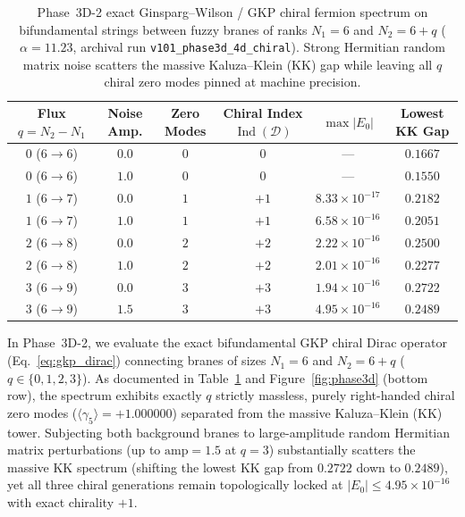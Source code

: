 \documentclass[11pt,a4paper]{article}
\begin{document}
\begin{table}[H]
  \centering
  \caption{Phase~3D-2 exact Ginsparg--Wilson / GKP chiral fermion spectrum on bifundamental strings between fuzzy branes of ranks $N_1 = 6$ and $N_2 = 6 + q$ ($\alpha = 11.23$, archival run \texttt{v101\_phase3d\_4d\_chiral}). Strong Hermitian random matrix noise scatters the massive Kaluza--Klein (KK) gap while leaving all $q$ chiral zero modes pinned at machine precision.}
  \label{tab:phase3d_chiral}
  \small
  \setlength{\tabcolsep}{6pt}
  \begin{tabular}{@{}cccccc@{}}
    \toprule
    Flux $q = N_2 - N_1$ & Noise Amp. & Zero Modes & Chiral Index $\operatorname{Ind}(\mathcal{D})$ & $\max |E_0|$ & Lowest KK Gap \\
    \midrule
    $0$ ($6 \to 6$) & $0.0$ & $0$ & $0$  & --- & $0.1667$ \\
    $0$ ($6 \to 6$) & $1.0$ & $0$ & $0$  & --- & $0.1550$ \\
    $1$ ($6 \to 7$) & $0.0$ & $1$ & $+1$ & $8.33\times 10^{-17}$ & $0.2182$ \\
    $1$ ($6 \to 7$) & $1.0$ & $1$ & $+1$ & $6.58\times 10^{-16}$ & $0.2051$ \\
    $2$ ($6 \to 8$) & $0.0$ & $2$ & $+2$ & $2.22\times 10^{-16}$ & $0.2500$ \\
    $2$ ($6 \to 8$) & $1.0$ & $2$ & $+2$ & $2.01\times 10^{-16}$ & $0.2277$ \\
    $3$ ($6 \to 9$) & $0.0$ & $3$ & $+3$ & $1.94\times 10^{-16}$ & $0.2722$ \\
    $3$ ($6 \to 9$) & $1.5$ & $3$ & $+3$ & $4.95\times 10^{-16}$ & $0.2489$ \\
    \bottomrule
  \end{tabular}
\end{table}

In Phase~3D-2, we evaluate the exact bifundamental GKP chiral Dirac operator (Eq.~\eqref{eq:gkp_dirac}) connecting branes of sizes $N_1 = 6$ and $N_2 = 6 + q$ ($q \in \{0,1,2,3\}$). As documented in Table~\ref{tab:phase3d_chiral} and Figure~\ref{fig:phase3d} (bottom row), the spectrum exhibits exactly $q$ strictly massless, purely right-handed chiral zero modes ($\langle\gamma_5\rangle = +1.000000$) separated from the massive Kaluza--Klein (KK) tower. Subjecting both background branes to large-amplitude random Hermitian matrix perturbations (up to $\mathrm{amp} = 1.5$ at $q=3$) substantially scatters the massive KK spectrum (shifting the lowest KK gap from $0.2722$ down to $0.2489$), yet all three chiral generations remain topologically locked at $|E_0| \le 4.95\times 10^{-16}$ with exact chirality $+1$.
\end{document}
